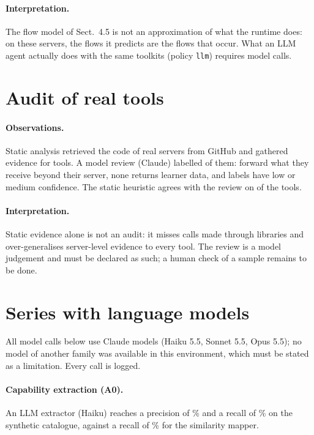 \documentclass[10pt]{article}
\begin{document}
\paragraph{Interpretation.} The flow model of Sect.~4.5 is not an approximation of what the runtime does: on these servers, the flows it predicts are the flows that occur. What an LLM agent actually does with the same toolkits (policy \texttt{llm}) requires model calls.

\section{Audit of real tools}
\paragraph{Observations.} Static analysis retrieved the code of \RAuServers{} real servers from GitHub and gathered evidence for \RAuTools{} tools. A model review (Claude) labelled \RAuReviewed{} of them: \RAuOut{} forward what they receive beyond their server, none returns learner data, and \RAuLowConf{} labels have low or medium confidence. The static heuristic agrees with the review on \RAuAgree{} of the \RAuReviewed{} tools.
\paragraph{Interpretation.} Static evidence alone is not an audit: it misses calls made through libraries and over-generalises server-level evidence to every tool. The review is a model judgement and must be declared as such; a human check of a sample remains to be done.

\section{Series with language models}
All model calls below use Claude models (Haiku 5.5, Sonnet 5.5, Opus 5.5); no model of another family was available in this environment, which must be stated as a limitation. Every call is logged.

\paragraph{Capability extraction (A0).} An LLM extractor (Haiku) reaches a precision of \RLaPrec\% and a recall of \RLaRec\% on the synthetic catalogue, against a recall of \RLaMapRec\% for the similarity mapper.
\end{document}

